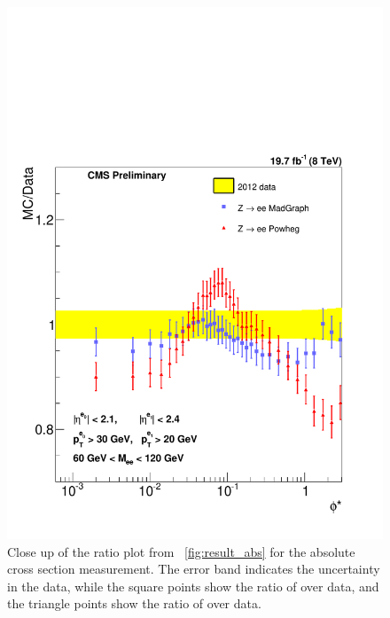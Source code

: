 \begin{figure}[!htbp]
    \centering
    \includegraphics[width=\textwidth]{figures/ZShape_Ratioelec_Abs_Dressed.pdf}
    \caption[
        Close up of the ratio plot from \FIG~\ref{fig:result_abs} for the
        absolute cross section measurement.
    ]{
        Close up of the ratio plot from \FIG~\ref{fig:result_abs} for the
        absolute cross section measurement. The error band indicates the
        uncertainty in the data, while the square points show the ratio of
        \MADGRAPH over data, and the triangle points show the ratio of \POWHEG
        over data.
    }
    \label{fig:result_ratio_abs}
\end{figure}
